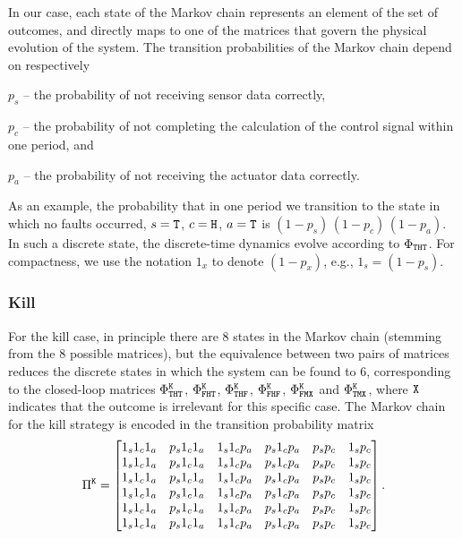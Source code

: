 In our case, each state of the Markov chain represents an element of the set of outcomes, and directly maps to one of the matrices that govern the physical evolution of the system.
The transition probabilities of the Markov chain depend on respectively
\begin{enumerate*}[label=(\roman*)]
    \item $p_s$ -- the probability of not receiving sensor data correctly,
    \item $p_c$ -- the probability of not completing the calculation of the control signal within one period, and
    \item $p_a$ -- the probability of not receiving the actuator data correctly.
\end{enumerate*}
As an example, the probability that in one period we transition to the state in which no faults occurred, $s=\texttt{T}$, $c=\texttt{H}$, $a=\texttt{T}$ is $(1-p_s)\,(1-p_c)\,(1-p_a)$.
In such a discrete state, the discrete-time dynamics evolve according to $\Phi_{\texttt{T}\texttt{H}\texttt{T}}$.
For compactness, we use the notation $1_x$ to denote $(1-p_x)$, e.g., $1_s = (1-p_s)$.

\subsubsection*{Kill}
For the kill case, in principle there are $8$ states in the Markov chain (stemming from the $8$ possible matrices), but the equivalence between two pairs of matrices reduces the discrete states in which the system can be found to $6$, corresponding to the closed-loop matrices $\Phi^{\texttt{K}}_{\texttt{T}\texttt{H}\texttt{T}}$, $\Phi^{\texttt{K}}_{\texttt{F}\texttt{H}\texttt{T}}$, $\Phi^{\texttt{K}}_{\texttt{T}\texttt{H}\texttt{F}}$, $\Phi^{\texttt{K}}_{\texttt{F}\texttt{H}\texttt{F}}$, $\Phi^{\texttt{K}}_{\texttt{F}\texttt{M}\texttt{X}}$ and $\Phi^{\texttt{K}}_{\texttt{T}\texttt{M}\texttt{X}}$, where $\texttt{X}$ indicates that the outcome is irrelevant for this specific case.
The Markov chain for the kill strategy is encoded in the transition probability matrix
\begin{equation}
\label{eq:pikill}
\Pi^{\Kill} = \begin{bmatrix}
        1_s1_c1_a & p_s1_c1_a & 1_s1_cp_a & p_s1_cp_a & p_sp_c & 1_sp_c \\
        1_s1_c1_a & p_s1_c1_a & 1_s1_cp_a & p_s1_cp_a & p_sp_c & 1_sp_c \\
        1_s1_c1_a & p_s1_c1_a & 1_s1_cp_a & p_s1_cp_a & p_sp_c & 1_sp_c \\
        1_s1_c1_a & p_s1_c1_a & 1_s1_cp_a & p_s1_cp_a & p_sp_c & 1_sp_c \\
        1_s1_c1_a & p_s1_c1_a & 1_s1_cp_a & p_s1_cp_a & p_sp_c & 1_sp_c \\
        1_s1_c1_a & p_s1_c1_a & 1_s1_cp_a & p_s1_cp_a & p_sp_c & 1_sp_c \\
\end{bmatrix}.
\end{equation}

